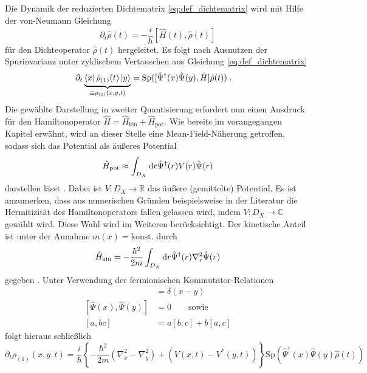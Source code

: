 \subsection{\lvn}\index{\lvn}
Die Dynamik der reduzierten Dichtematrix \eqref{eq:def_dichtematrix} wird mit Hilfe der von-Neumann Gleichung
\begin{equation*}
    \partial_t \hat{\rho}(t) = - \frac{i}{\hbar}[\hat{H}(t), \hat{\rho}(t)]
\end{equation*}
für den Dichteoperator $\hat{\rho}(t)$ hergeleitet. Es folgt nach Ausnutzen der Spurinvarianz unter zyklischem Vertauschen aus Gleichung \eqref{eq:def_dichtematrix}
\begin{align*}
  \partial_t \underbrace{\bra{x}\hat{\rho}_{(1)}(t) \ket{y}}_{\equiv \rho_{(1)}(x,y,t)} &= \text{Sp}([\hat{\Psi}^{\dagger}(x)\hat{\Psi}(y),\hat{H}]\hat{\rho}(t)) \; .
\end{align*}
Die gewählte Darstellung in zweiter Quantisierung erfordert nun einen Ausdruck für den Hamiltonoperator ${\hat{H}=\hat{H}_{\text{kin}} + \hat{H}_{\text{pot}}}$. Wie bereits im vorangegangen Kapitel erwähnt, wird an dieser Stelle eine Mean-Field-Näherung getroffen, sodass sich das Potential als äußeres Potential
\begin{equation}
    \hat{H}_{\text{pot}} \approx \int_{D_X} \mathop{}\!\mathrm{d} r \hat{\Psi}^{\dagger}(r)V(r)\hat{\Psi}(r)
    \label{eq:Hpot}
\end{equation}
darstellen lässt \cite{modern}. Dabei ist ${V: D_X \rightarrow \mathbb{R}}$ das äußere (gemittelte) Potential. Es ist anzumerken, dass aus numerischen Gründen beispielsweise in der Literatur \cite{lukas1} die Hermitizität des Hamiltonoperators fallen gelassen wird, indem ${V: D_X \rightarrow \mathbb{C}}$ gewählt wird. Diese Wahl wird im Weiteren berücksichtigt. Der kinetische Anteil ist unter der Annahme ${m(x)=\text{konst.}}$ durch
\begin{equation*}
  \hat{H}_{\text{kin}} = -\frac{\hbar^2}{2m}\int_{D_X} \mathop{}\!\mathrm{d} r \hat{\Psi}^{\dagger}(r)\nabla_r^2\hat{\Psi}(r)
\end{equation*}
gegeben \cite{modern}. Unter Verwendung der fermionischen Kommutator-Relationen   \cite{modern}
\begin{align*}
  [\hat{\Psi}(x),\hat{\Psi}^{\dagger}(y)]&=\delta(x-y) \\
  [\hat{\Psi}(x),\hat{\Psi}(y)]&=0  \qquad \text{sowie}\\
  [a,bc]&=a[b,c]+b[a,c]
\end{align*}
folgt hieraus schließlich
\begin{equation*}
  \partial_t \rho_{(1)}(x,y,t) = \frac{i}{\hbar}\left\{-\frac{\hbar^2}{2m}(\nabla_x^2 - \nabla_y^2) + (V(x,t) - V^*(y,t)) \right\}
                          \text{Sp}(\hat{\Psi}^{\dagger}(x) \hat{\Psi}(y) \hat{\rho}(t))
\end{equation*}
